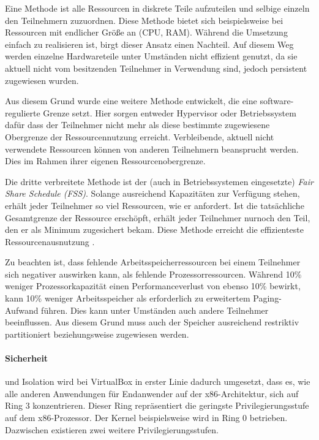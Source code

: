 Eine Methode ist alle Ressourcen in diskrete Teile aufzuteilen und selbige einzeln den Teilnehmern
zuzuordnen. Diese Methode bietet sich beispielsweise bei Ressourcen mit endlicher Größe an
(CPU, RAM). Während die Umsetzung einfach zu realisieren ist, birgt dieser Ansatz einen Nachteil.
Auf diesem Weg werden einzelne Hardwareteile unter Umständen nicht effizient genutzt,
da sie aktuell nicht vom besitzenden Teilnehmer in Verwendung sind, jedoch persistent zugewiesen wurden.

Aus diesem Grund wurde eine weitere Methode entwickelt, die eine software-regulierte Grenze setzt.
Hier sorgen entweder Hypervisor oder Betriebssystem dafür dass der Teilnehmer nicht mehr als
diese bestimmte zugewiesene Obergrenze der Ressourcennutzung erreicht. Verbleibende, aktuell
nicht verwendete Ressourcen können von anderen Teilnehmern beansprucht werden. Dies im Rahmen
ihrer eigenen Ressourcenobergrenze\cite{victor10}.

Die dritte verbreitete Methode ist der (auch in Betriebssystemen eingesetzte)
\textit{Fair Share Schedule (FSS)}. Solange ausreichend Kapazitäten zur Verfügung stehen,
erhält jeder Teilnehmer so viel Ressourcen, wie er anfordert. Ist die tatsächliche Gesamtgrenze der
Ressource erschöpft, erhält jeder Teilnehmer nurnoch den Teil, den er als Minimum zugesichert bekam.
Diese Methode erreicht die effizienteste Ressourcenausnutzung \cite{victor10}.

Zu beachten ist, dass fehlende Arbeitsspeicherressourcen bei einem Teilnehmer sich negativer auswirken
kann, als fehlende Prozessorressourcen. Während 10\% weniger Prozessorkapazität einen
Performanceverlust von ebenso 10\% bewirkt, kann 10\% weniger Arbeitsspeicher als erforderlich zu
erweitertem Paging-Aufwand führen. Dies kann unter Umständen auch andere Teilnehmer beeinflussen.
Aus diesem Grund muss auch der Speicher ausreichend restriktiv partitioniert beziehungsweise zugewiesen werden.

\paragraph{Sicherheit} und Isolation wird bei VirtualBox in erster Linie dadurch umgesetzt, dass
es, wie alle anderen Anwendungen für Endanwender auf der x86-Architektur, sich auf Ring 3 konzentrieren.
Dieser Ring repräsentiert die geringste Privilegierungsstufe auf dem x86-Prozessor. Der Kernel
beispielsweise wird in Ring 0 betrieben. Dazwischen existieren zwei weitere Privilegierungsstufen.

